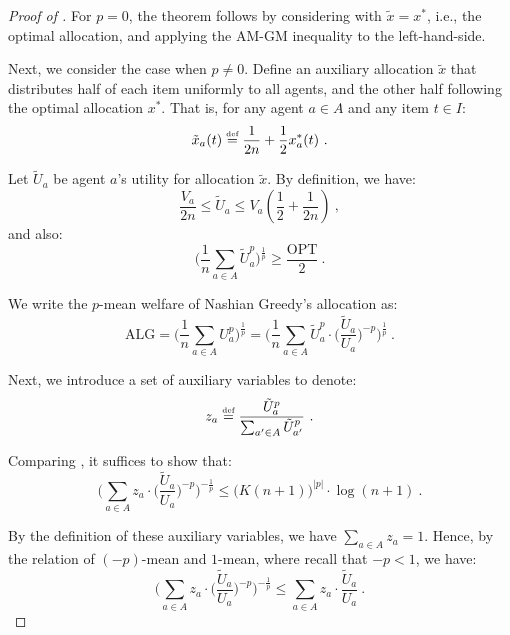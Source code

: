 \documentclass[11pt,letterpaper]{article}
\newcommand{\OPT}{\mathrm{OPT}}
\newcommand{\ALG}{\mathrm{ALG}}
\newcommand{\utility}{U}
\newcommand{\defeq}{\stackrel{\textrm{\tiny def}}{=}}
\begin{document}
\begin{proof}[Proof of ]
	For $p = 0$, the theorem follows by considering  with $\tilde{x} = x^*$, i.e., the optimal allocation, and applying the AM-GM inequality to the left-hand-side.
	
	Next, we consider the case when $p \ne 0$.
	Define an auxiliary allocation $\tilde{x}$ that distributes half of each item uniformly to all agents, and the other half following the optimal allocation $x^*$.
	That is, for any agent $a \in A$ and any item $t \in I$:
	\[
	\tilde{x}_a(t) \defeq \frac{1}{2n} + \frac{1}{2} x^*_a(t)
	~.
	\]
	
	Let $\tilde{U}_a$ be agent $a$'s utility for allocation $\tilde{x}$.
	By definition, we have:
	\begin{equation}
		\label{eqn:auxiliary-utility-range-app}
		\frac{V_a}{2n} \le \tilde{U}_a \le V_a \left(\frac{1}{2} + \frac{1}{2n} \right)
		~,
	\end{equation}
	and also:
	\begin{equation}
		\label{eqn:auxiliary-allocation-approximation-app}
		\bigg( \frac{1}{n} \sum_{a \in A} \tilde{\utility}_a^p \bigg)^{\frac{1}{p}} \ge \frac{\OPT}{2}
		~.
	\end{equation}
	
	We write the $p$-mean welfare of Nashian Greedy's allocation as:
	\begin{equation}
		\label{eq:nashian-p-mean-rewrite-app}	
		\ALG = \bigg( \frac{1}{n} \sum_{a \in A} \utility_a^p \bigg)^{\frac{1}{p}} = \bigg(\frac{1}{n} \sum_{a \in A} \tilde{\utility}_a^p \cdot \Big( \frac{\tilde{\utility}_a}{\utility_a} \Big)^{-p} \bigg)^{\frac{1}{p}}
		~.
	\end{equation}
	
	Next, we introduce a set of auxiliary variables to denote:
	\[
	z_a \defeq \frac{\tilde{\utility}_a^p}{\sum_{a' \in A} \tilde{\utility}_{a'}^p}
	~.
	\]
	
	Comparing , it suffices to show that:
	\[
	\bigg( \sum_{a \in A} z_a \cdot \Big( \frac{\tilde{\utility}_a}{\utility_a} \Big)^{-p} \bigg)^{-\frac{1}{p}} \le \big(K(n+1)\big)^{|p|} \cdot \log(n+1)
	~.
	\]
	
	By the definition of these auxiliary variables, we have $\sum_{a \in A} z_a = 1$.
	Hence, by the relation of $(-p)$-mean and $1$-mean, where recall that $-p < 1$, we have:
	\[
	\bigg( \sum_{a \in A} z_a \cdot \Big( \frac{\tilde{\utility}_a}{\utility_a} \Big)^{-p} \bigg)^{-\frac{1}{p}}\le \sum_{a \in A}  z_a \cdot \frac{\tilde{\utility}_a}{\utility_a}
	~.
	\]
	

\end{proof}
\end{document}
